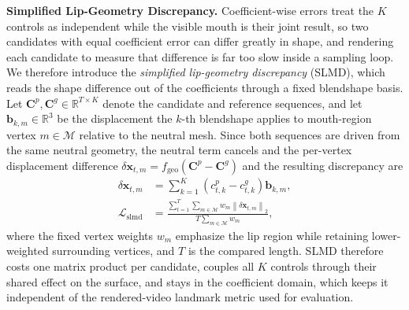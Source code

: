 \noindent\textbf{Simplified Lip-Geometry Discrepancy.}\quad
Coefficient-wise errors treat the $K$ controls as independent while the visible mouth is their joint result, so two candidates with equal coefficient error can differ greatly in shape, and rendering each candidate to measure that difference is far too slow inside a sampling loop. We therefore introduce the \emph{simplified lip-geometry discrepancy} (SLMD), which reads the shape difference out of the coefficients through a fixed blendshape basis. Let $\mathbf{C}^{p},\mathbf{C}^{g}\!\in\!\mathbb{R}^{T\times K}$ denote the candidate and reference sequences, and let $\mathbf{b}_{k,m}\!\in\!\mathbb{R}^{3}$ be the displacement the $k$-th blendshape applies to mouth-region vertex $m\!\in\!\mathcal{M}$ relative to the neutral mesh. Since both sequences are driven from the same neutral geometry, the neutral term cancels and the per-vertex displacement difference $\delta\mathbf{x}_{t,m}=f_{\mathrm{geo}}(\mathbf{C}^{p}\!-\!\mathbf{C}^{g})$ and the resulting discrepancy are
\begin{align}
    \delta\mathbf{x}_{t,m}&=\sum_{k=1}^{K}\left(c^{p}_{t,k}-c^{g}_{t,k}\right)\mathbf{b}_{k,m}, \label{eq:slmd_disp}\\
    \mathcal{L}_{\mathrm{slmd}}&=\frac{\sum_{t=1}^{T}\sum_{m\in\mathcal{M}}w_{m}\left\|\delta\mathbf{x}_{t,m}\right\|_{2}}{T\sum_{m\in\mathcal{M}}w_{m}}, \label{eq:slmd}
\end{align}
where the fixed vertex weights $w_{m}$ emphasize the lip region while retaining lower-weighted surrounding vertices, and $T$ is the compared length. SLMD therefore costs one matrix product per candidate, couples all $K$ controls through their shared effect on the surface, and stays in the coefficient domain, which keeps it independent of the rendered-video landmark metric used for evaluation.

